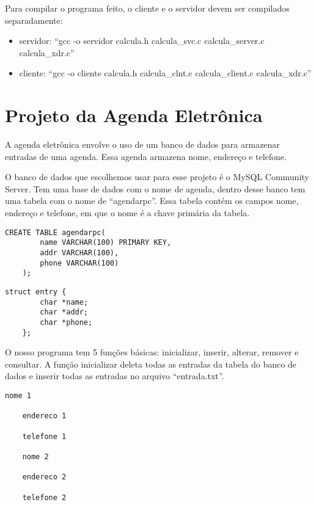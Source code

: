 \documentclass[12pt,a4paper]{article}
\begin{document}
Para compilar o programa feito, o cliente e o servidor devem ser compilados separadamente:
\begin{itemize}
	\item servidor: ``gcc -o servidor calcula.h calcula\_svc.c calcula\_server.c calcula\_xdr.c''
	\item cliente: ``gcc -o cliente calcula.h calcula\_clnt.c calcula\_client.c calcula\_xdr.c''
\end{itemize}

\section{Projeto da Agenda Eletrônica}

A agenda eletrônica envolve o uso de um banco de dados para armazenar entradas de
uma agenda. Essa agenda armazena nome, endereço e telefone.

O banco de dados que escolhemos usar para esse projeto é o MySQL Community Server\cite{mysql}.
Tem uma base de dados com o nome de agenda, dentro desse banco tem uma tabela com o nome de
``agendarpc''. Essa tabela contém os campos nome, endereço e telefone, em que o nome é a chave
primária da tabela.

\lstset{language=SQL}
\begin{lstlisting}[caption=Comando no MySQL usado para criar a tabela]
	CREATE TABLE agendarpc(
		name VARCHAR(100) PRIMARY KEY,
		addr VARCHAR(100),
		phone VARCHAR(100)
	);
\end{lstlisting}

\lstset{language=C}
\begin{lstlisting}[caption=Struct para organizar os dados]
	struct entry {
		char *name;
		char *addr;
		char *phone;
	};
\end{lstlisting}

O nosso programa tem 5 funções básicas: inicializar, inserir, alterar, remover e consultar.
A função inicializar deleta todas as entradas da tabela do banco de dados e inserir todas 
as entradas no arquivo ``entrada.txt''.

\begin{lstlisting}[caption=Formato do arquivo de entrada para a função inicializar]
	nome 1
	
	endereco 1
	
	telefone 1
	
	nome 2
	
	endereco 2
	
	telefone 2
\end{lstlisting}
\end{document}
